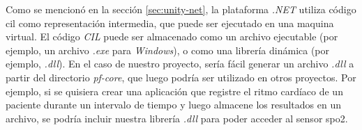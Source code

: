 Como se mencionó en la sección \ref{sec:unity-net}, la plataforma \emph{.NET} utiliza código \acrshort{cil} como representación intermedia, que puede ser ejecutado en una maquina virtual. El código \emph{CIL} puede ser almacenado como un archivo ejecutable (por ejemplo, un archivo \emph{.exe} para \emph{Windows}), o como una librería dinámica (por ejemplo, \emph{.dll}). En el caso de nuestro proyecto, sería fácil generar un archivo \emph{.dll} a partir del directorio \emph{pf-core}, que luego podría ser utilizado en otros proyectos. Por ejemplo, si se quisiera crear una aplicación que registre el ritmo cardíaco de un paciente durante un intervalo de tiempo y luego almacene los resultados en un archivo, se podría incluir nuestra librería \emph{.dll} para poder acceder al sensor \acrshort{spo2}.